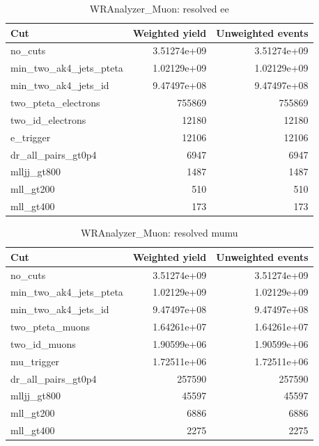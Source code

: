 \documentclass{article}
\begin{document}
\begin{table}[htbp]
\centering
\caption{WRAnalyzer\_Muon: resolved ee}
\begin{tabular}{lrr}
\hline
Cut & Weighted yield & Unweighted events \\
\hline
no\_cuts & 3.51274e+09 & 3.51274e+09 \\
min\_two\_ak4\_jets\_pteta & 1.02129e+09 & 1.02129e+09 \\
min\_two\_ak4\_jets\_id & 9.47497e+08 & 9.47497e+08 \\
two\_pteta\_electrons & 755869 & 755869 \\
two\_id\_electrons & 12180 & 12180 \\
e\_trigger & 12106 & 12106 \\
dr\_all\_pairs\_gt0p4 & 6947 & 6947 \\
mlljj\_gt800 & 1487 & 1487 \\
mll\_gt200 & 510 & 510 \\
mll\_gt400 & 173 & 173 \\
\hline
\end{tabular}
\end{table}

\begin{table}[htbp]
\centering
\caption{WRAnalyzer\_Muon: resolved mumu}
\begin{tabular}{lrr}
\hline
Cut & Weighted yield & Unweighted events \\
\hline
no\_cuts & 3.51274e+09 & 3.51274e+09 \\
min\_two\_ak4\_jets\_pteta & 1.02129e+09 & 1.02129e+09 \\
min\_two\_ak4\_jets\_id & 9.47497e+08 & 9.47497e+08 \\
two\_pteta\_muons & 1.64261e+07 & 1.64261e+07 \\
two\_id\_muons & 1.90599e+06 & 1.90599e+06 \\
mu\_trigger & 1.72511e+06 & 1.72511e+06 \\
dr\_all\_pairs\_gt0p4 & 257590 & 257590 \\
mlljj\_gt800 & 45597 & 45597 \\
mll\_gt200 & 6886 & 6886 \\
mll\_gt400 & 2275 & 2275 \\
\hline
\end{tabular}
\end{table}
\end{document}
